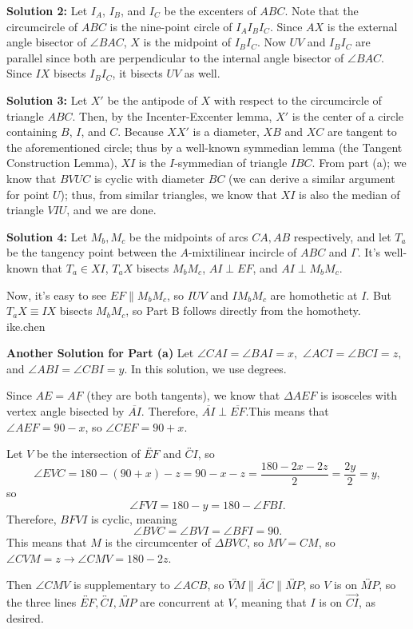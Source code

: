 \begin{enumerate}
 \textbf{Solution 2:} Let $I_A$, $I_B$, and $I_C$ be the excenters of $ABC$. Note that the circumcircle of $ABC$ is the nine-point circle of $I_AI_BI_C$. Since $AX$ is the external angle bisector of $\angle BAC$, $X$ is the midpoint of $I_BI_C$. Now $UV$ and $I_BI_C$ are parallel since both are perpendicular to the internal angle bisector of $\angle BAC$. Since $IX$ bisects $I_BI_C$, it bisects $UV$ as well.

 \textbf{Solution 3:} Let $X'$ be the antipode of $X$ with respect to the circumcircle of triangle $ABC$. Then, by the Incenter-Excenter lemma, $X'$ is the center of a circle containing $B$, $I$, and $C$. Because $XX'$ is a diameter, $XB$ and $XC$ are tangent to the aforementioned circle; thus by a well-known symmedian lemma (the Tangent Construction Lemma), $XI$ is the $I$-symmedian of triangle $IBC$. From part (a); we know that $BVUC$ is cyclic with diameter $BC$ (we can derive a similar argument for point $U$); thus, from similar triangles, we know that $XI$ is also the median of triangle $VIU$, and we are done.

 \textbf{Solution 4:} Let $M_b, M_c$ be the midpoints of arcs $CA, AB$ respectively, and let $T_a$ be the tangency point between the $A$-mixtilinear incircle of $ABC$ and $\Gamma$. It's well-known that $T_a \in XI$, $T_aX$ bisects $M_bM_c$, $AI \perp EF$, and $AI \perp M_bM_c$.

 Now, it's easy to see $EF \parallel M_bM_c$, so $IUV$ and $IM_bM_c$ are homothetic at $I$. But $T_aX \equiv IX$ bisects $M_bM_c$, so Part $\text{B}$ follows directly from the homothety. ~ ike.chen

 \textbf{Another Solution for Part (a)} Let $\angle CAI = \angle BAI = x,$ $\angle ACI = \angle BCI = z,$ and $\angle ABI = \angle CBI = y$. In this solution, we use degrees.

 
Since $AE = AF$ (they are both tangents), we know that $\Delta AEF$ is isosceles with vertex angle bisected by $\overline{AI}$. Therefore, $\overline{AI} \perp \overline{EF}$.This means that $\angle AEF = 90 - x$, so $\angle CEF = 90 + x$.

 
Let $V$ be the intersection of $\overleftrightarrow{EF}$ and $\overleftrightarrow{CI}$, so
 \[\angle EVC = 180 - (90 + x) - z = 90 - x - z = \frac{180-2x-2z}{2}= \frac{2y}{2} = y,\] so
 \[\angle FVI = 180 - y = 180 - \angle FBI.\]Therefore, $BFVI$ is cyclic, meaning
 \[\angle BVC = \angle BVI = \angle BFI = 90.\]This means that $M$ is the circumcenter of $\Delta BVC$, so $MV = CM$, so $\angle CVM = z \rightarrow \angle CMV = 180 - 2z$.

 
Then $\angle CMV$ is supplementary to $\angle ACB$, so $\overleftrightarrow{VM} \parallel \overleftrightarrow{AC} \parallel \overleftrightarrow{MP}$, so $V$ is on $\overleftrightarrow{MP}$, so the three lines $\overleftrightarrow{EF}, \overleftrightarrow{CI}, \overleftrightarrow{MP}$ are concurrent at $V$, meaning that $I$ is on $\overrightarrow{CI}$, as desired.

 


\end{enumerate}